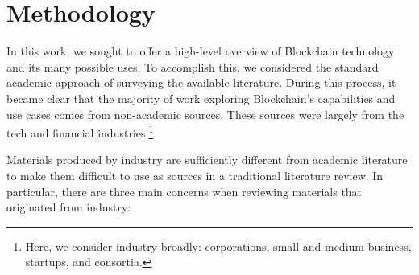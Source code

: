 
\section{Methodology}
\label{sec:method}

In this work, we sought to offer a high-level overview of Blockchain technology and its many possible uses.  To accomplish this, we considered the standard academic approach of surveying the available literature. During this process, it became clear that the majority of work exploring Blockchain's capabilities and use cases comes from non-academic sources. These sources were largely from the tech and financial industries.\footnote{Here, we consider industry broadly: corporations, small and medium business, startups, and consortia.}

Materials produced by industry are sufficiently different from academic literature to make them difficult to use as sources in a traditional literature review.
In particular, there are three main concerns when reviewing materials that originated from industry:

